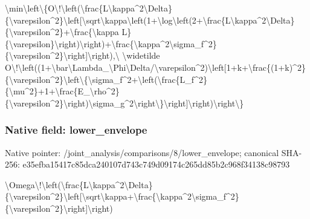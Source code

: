 \documentclass[10pt,a4paper]{article}
\begin{document}
\textbackslash{}min\textbackslash{}left\textbackslash{}\{O\textbackslash{}!\textbackslash{}left(\textbackslash{}fra\allowbreak{}c\{L\textbackslash{}kappa\textasciicircum{}2\textbackslash{}Delta\}\{\textbackslash{}vare\allowbreak{}psilon\textasciicircum{}2\}\textbackslash{}left[\textbackslash{}sqrt\textbackslash{}kap\allowbreak{}pa\textbackslash{}left(1+\textbackslash{}log\textbackslash{}left(2+\textbackslash{}f\allowbreak{}rac\{L\textbackslash{}kappa\textasciicircum{}2\textbackslash{}Delta\}\{\textbackslash{}va\allowbreak{}repsilon\textasciicircum{}2\}+\textbackslash{}frac\{\textbackslash{}kappa L\}\{\textbackslash{}varepsilon\}\textbackslash{}right)\textbackslash{}r\allowbreak{}ight)+\textbackslash{}frac\{\textbackslash{}kappa\textasciicircum{}2\textbackslash{}sig\allowbreak{}ma\_f\textasciicircum{}2\}\{\textbackslash{}varepsilon\textasciicircum{}2\}\textbackslash{}r\allowbreak{}ight]\textbackslash{}right),\textbackslash{} \textbackslash{}widetilde O\textbackslash{}!\textbackslash{}left((1+\textbackslash{}bar\textbackslash{}Lambda\_\allowbreak{}\textbackslash{}Phi\textbackslash{}Delta/\textbackslash{}varepsilon\textasciicircum{}2\allowbreak{})\textbackslash{}left[1+k+\textbackslash{}frac\{(1+k)\textasciicircum{}2\allowbreak{}\}\{\textbackslash{}varepsilon\textasciicircum{}2\}\textbackslash{}left\textbackslash{}\{\textbackslash{}\allowbreak{}sigma\_f\textasciicircum{}2+\textbackslash{}left(\textbackslash{}frac\{L\_\allowbreak{}f\textasciicircum{}2\}\{\textbackslash{}mu\textasciicircum{}2\}+1+\textbackslash{}frac\{E\_\textbackslash{}r\allowbreak{}ho\textasciicircum{}2\}\{\textbackslash{}varepsilon\textasciicircum{}2\}\textbackslash{}rig\allowbreak{}ht)\textbackslash{}sigma\_g\textasciicircum{}2\textbackslash{}right\textbackslash{}\}\textbackslash{}ri\allowbreak{}ght]\textbackslash{}right)\textbackslash{}right\textbackslash{}\}


\subsubsection{Native field: lower\_envelope}


Native pointer: /joint\_analysis/comparis\allowbreak{}ons/8/lower\_envelope; canonical SHA-256: e35efba15417c85dca240107\allowbreak{}d743c749d09174c265dd85b2\allowbreak{}c968f34138c98793


\textbackslash{}Omega\textbackslash{}!\textbackslash{}left(\textbackslash{}frac\{L\textbackslash{}ka\allowbreak{}ppa\textasciicircum{}2\textbackslash{}Delta\}\{\textbackslash{}varepsilon\allowbreak{}\textasciicircum{}2\}\textbackslash{}left[\textbackslash{}sqrt\textbackslash{}kappa+\textbackslash{}fr\allowbreak{}ac\{\textbackslash{}kappa\textasciicircum{}2\textbackslash{}sigma\_f\textasciicircum{}2\}\{\textbackslash{}\allowbreak{}varepsilon\textasciicircum{}2\}\textbackslash{}right]\textbackslash{}rig\allowbreak{}ht)
\end{document}
